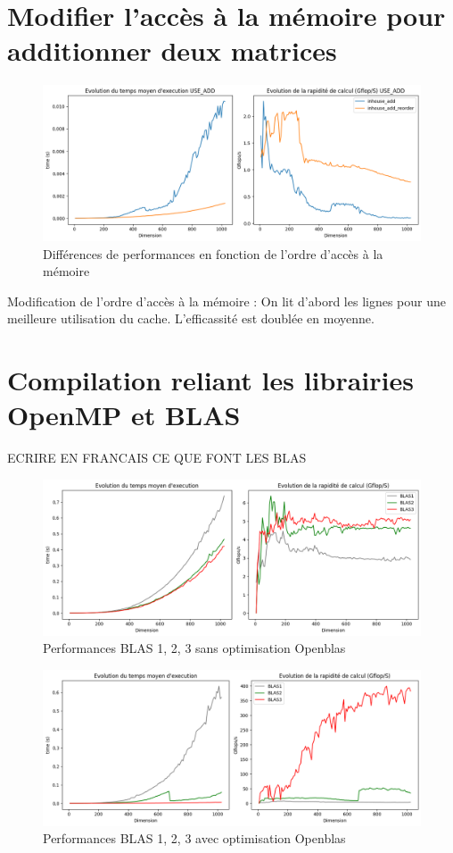 \documentclass{report}
\begin{document}
\tableofcontents

\newpage


\chapter{Modifier l'accès à la mémoire pour additionner deux matrices}

\begin{figure}[H]
    \centering
    \includegraphics[width=0.7\linewidth]{images/fig3.png}
    \caption{Différences de performances en fonction de l'ordre d'accès à la mémoire}
    \label{fig:3}
\end{figure}

Modification de l'ordre d'accès à la mémoire : On lit d'abord les lignes pour une meilleure utilisation du cache. L'efficassité est doublée en moyenne.



\chapter{Compilation reliant les librairies OpenMP et BLAS}

ECRIRE EN FRANCAIS CE QUE FONT LES BLAS

\begin{figure}[H]
    \centering
    \includegraphics[width=0.7\linewidth]{images/fig1.png}
    \caption{Performances BLAS 1, 2, 3 sans optimisation Openblas}
    \label{fig:1}
\end{figure}

\begin{figure}[H]
    \centering
    \includegraphics[width=0.7\linewidth]{images/fig2.png}
    \caption{Performances BLAS 1, 2, 3 avec optimisation Openblas}
    \label{fig:2}
\end{figure}
\end{document}
